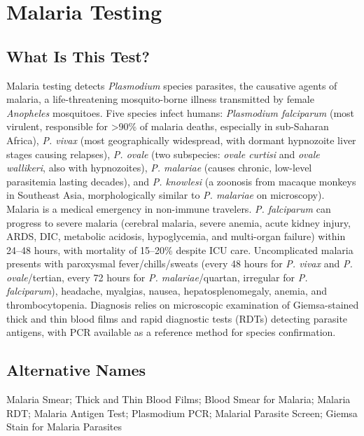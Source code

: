 \chapter{Malaria Testing}

\section*{What Is This Test?}
Malaria testing detects \textit{Plasmodium} species parasites, the causative agents of malaria, a life-threatening mosquito-borne illness transmitted by female \textit{Anopheles} mosquitoes. Five species infect humans: \textit{Plasmodium falciparum} (most virulent, responsible for >90\% of malaria deaths, especially in sub-Saharan Africa), \textit{P. vivax} (most geographically widespread, with dormant hypnozoite liver stages causing relapses), \textit{P. ovale} (two subspecies: \textit{ovale curtisi} and \textit{ovale wallikeri}, also with hypnozoites), \textit{P. malariae} (causes chronic, low-level parasitemia lasting decades), and \textit{P. knowlesi} (a zoonosis from macaque monkeys in Southeast Asia, morphologically similar to \textit{P. malariae} on microscopy). Malaria is a medical emergency in non-immune travelers. \textit{P. falciparum} can progress to severe malaria (cerebral malaria, severe anemia, acute kidney injury, ARDS, DIC, metabolic acidosis, hypoglycemia, and multi-organ failure) within 24--48 hours, with mortality of 15--20\% despite ICU care. Uncomplicated malaria presents with paroxysmal fever/chills/sweats (every 48 hours for \textit{P. vivax} and \textit{P. ovale}/tertian, every 72 hours for \textit{P. malariae}/quartan, irregular for \textit{P. falciparum}), headache, myalgias, nausea, hepatosplenomegaly, anemia, and thrombocytopenia. Diagnosis relies on microscopic examination of Giemsa-stained thick and thin blood films and rapid diagnostic tests (RDTs) detecting parasite antigens, with PCR available as a reference method for species confirmation.

\section*{Alternative Names}
Malaria Smear; Thick and Thin Blood Films; Blood Smear for Malaria; Malaria RDT; Malaria Antigen Test; Plasmodium PCR; Malarial Parasite Screen; Giemsa Stain for Malaria Parasites


